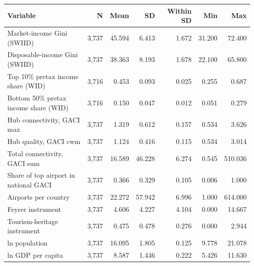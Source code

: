 \begin{tabular}{lrrrrrr}
\toprule
Variable & N & Mean & SD & Within SD & Min & Max \\
\midrule
Market-income Gini (SWIID) & 3,737 & 45.594 & 6.413 & 1.672 & 31.200 & 72.400 \\
Disposable-income Gini (SWIID) & 3,737 & 38.363 & 8.193 & 1.678 & 22.100 & 65.800 \\
Top 10\% pretax income share (WID) & 3,716 & 0.453 & 0.093 & 0.025 & 0.255 & 0.687 \\
Bottom 50\% pretax income share (WID) & 3,716 & 0.150 & 0.047 & 0.012 & 0.051 & 0.279 \\
Hub connectivity, GACI max & 3,737 & 1.319 & 0.612 & 0.157 & 0.534 & 3.626 \\
Hub quality, GACI cwm & 3,737 & 1.124 & 0.416 & 0.115 & 0.534 & 3.014 \\
Total connectivity, GACI sum & 3,737 & 16.589 & 46.228 & 6.274 & 0.545 & 510.036 \\
Share of top airport in national GACI & 3,737 & 0.366 & 0.329 & 0.105 & 0.006 & 1.000 \\
Airports per country & 3,737 & 22.272 & 57.942 & 6.996 & 1.000 & 614.000 \\
Feyrer instrument & 3,737 & 4.606 & 4.227 & 4.104 & 0.000 & 14.667 \\
Tourism-heritage instrument & 3,737 & 0.475 & 0.478 & 0.276 & 0.000 & 2.944 \\
ln population & 3,737 & 16.095 & 1.805 & 0.125 & 9.778 & 21.078 \\
ln GDP per capita & 3,737 & 8.587 & 1.446 & 0.222 & 5.426 & 11.630 \\
\bottomrule
\end{tabular}